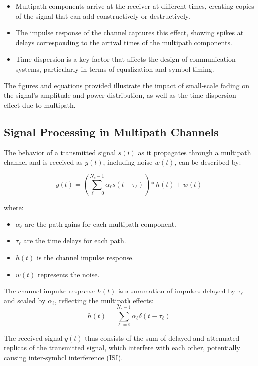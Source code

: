 \begin{itemize}
    \item Multipath components arrive at the receiver at different times, creating copies of the signal that can add constructively or destructively.
    \item The impulse response of the channel captures this effect, showing spikes at delays corresponding to the arrival times of the multipath components.
    \item Time dispersion is a key factor that affects the design of communication systems, particularly in terms of equalization and symbol timing.
\end{itemize}
The figures and equations provided illustrate the impact of small-scale fading on the signal's amplitude and power distribution, as well as the time dispersion effect due to multipath.


\subsection*{Signal Processing in Multipath Channels}

The behavior of a transmitted signal \( s(t) \) as it propagates through a multipath channel and is received as \( y(t) \), including noise \( w(t) \), can be described by:

\begin{equation}
    y(t) = \left( \sum_{\ell=0}^{N_c-1} \alpha_{\ell} s(t - \tau_{\ell}) \right) \ast h(t) + w(t)
\end{equation}

where:
\begin{itemize}
    \item \( \alpha_{\ell} \) are the path gains for each multipath component.
    \item \( \tau_{\ell} \) are the time delays for each path.
    \item \( h(t) \) is the channel impulse response.
    \item \( w(t) \) represents the noise.
\end{itemize}

The channel impulse response \( h(t) \) is a summation of impulses delayed by \( \tau_{\ell} \) and scaled by \( \alpha_{\ell} \), reflecting the multipath effects:
\begin{equation}
    h(t) = \sum_{\ell=0}^{N_c-1} \alpha_{\ell} \delta(t - \tau_{\ell})
\end{equation}

The received signal \( y(t) \) thus consists of the sum of delayed and attenuated replicas of the transmitted signal, which interfere with each other, potentially causing inter-symbol interference (ISI).

